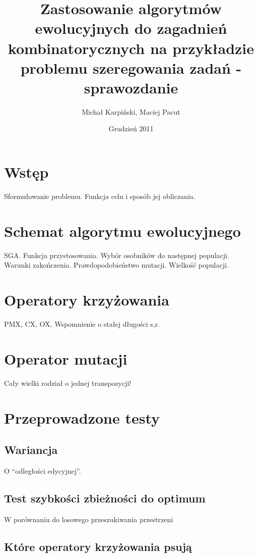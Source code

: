 \documentclass[12pt]{article}
\title{Zastosowanie algorytmów ewolucyjnych do zagadnień
  kombinatorycznych na przykładzie problemu szeregowania zadań - sprawozdanie}
\author{Michał Karpiński, Maciej Pacut}
\date{Grudzień 2011}
\begin{document}
  \maketitle
\section{Wstęp}
Sformułowanie problemu. Funkcja celu i sposób jej obliczania.
\section{Schemat algorytmu ewolucyjnego}
SGA. Funkcja przystosowania. Wybór osobników do następnej populacji.
Warunki zakończenia. Prawdopodobieństwo mutacji. Wielkość populacji.
\section{Operatory krzyżowania}
PMX, CX, OX. Wspomnienie o stałej długości s,r.
\section{Operator mutacji}
Cały wielki rodział o jednej transpozycji!
\section{Przeprowadzone testy}
\subsection{Wariancja}
O ``odległości edycyjnej''.
\subsection{Test szybkości zbieżności do optimum}
W porównaniu do losowego przeszukiwania przestrzeni
\subsection{Które operatory krzyżowania psują}
\end{document}
